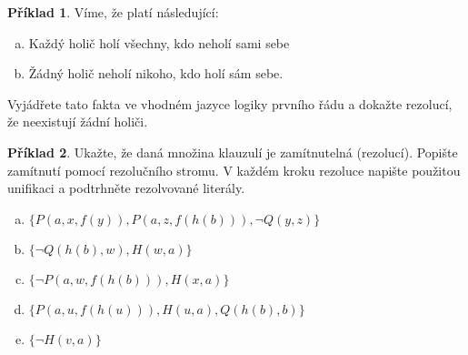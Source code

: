 \documentclass[11pt,a4paper]{amsart}
\theoremstyle{definition}
\newtheorem{problem}{Příklad}
\theoremstyle{remark}
\begin{document}
\bigskip

\begin{problem} Víme, že platí následující:
\medskip
\begin{enumerate}[(a)]
\itemsep12pt
\item Každý holič holí všechny, kdo neholí sami sebe
\item Žádný holič neholí nikoho, kdo holí sám sebe.
\end{enumerate}
\medskip
Vyjádřete tato fakta ve vhodném jazyce logiky prvního řádu a dokažte rezolucí, že neexistují žádní holiči.
\end{problem}



\medskip\begin{problem}
Ukažte, že daná množina klauzulí je zamítnutelná (rezolucí). Popište zamítnutí pomocí rezolučního stromu. V každém kroku rezoluce napište použitou unifikaci a podtrhněte rezolvované literály.
\begin{enumerate}[(a)]
\item $\{P(a,x,f(y)),P(a,z,f(h(b))),\neg Q(y,z)\}$
\item $\{\neg Q(h(b),w),H(w,a)\}$
\item $\{\neg P(a,w,f(h(b))),H(x,a)\}$
\item $\{P(a,u,f(h(u))),H(u,a),Q(h(b),b)\}$
\item $\{\neg H(v,a)\}$
\end{enumerate}
\end{problem}
\end{document}
